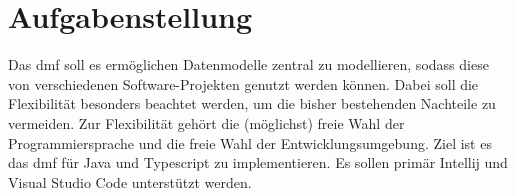 \documentclass[./einleitung.tex]{subfiles}
\begin{document}
\section{Aufgabenstellung}
Das \acrfull{dmf} soll es ermöglichen Datenmodelle zentral zu modellieren, sodass diese von verschiedenen Software-Projekten genutzt werden können.
Dabei soll die Flexibilität besonders beachtet werden, um die bisher bestehenden Nachteile zu vermeiden.
Zur Flexibilität gehört die (möglichst) freie Wahl der Programmiersprache und die freie Wahl der Entwicklungsumgebung.
\newline
Ziel ist es das \acrshort{dmf} für Java und Typescript zu implementieren.
Es sollen primär Intellij und Visual Studio Code unterstützt werden.
\end{document}

